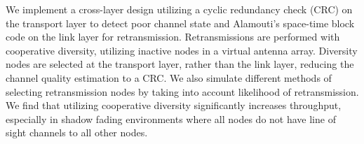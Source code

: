 We implement a cross-layer design utilizing a cyclic redundancy check (CRC) on the transport layer to detect poor channel state and Alamouti's space-time block code on the link layer for retransmission.
Retransmissions are performed with cooperative diversity, utilizing inactive nodes in a virtual antenna array.
Diversity nodes are selected at the transport layer, rather than the link layer, reducing the channel quality estimation to a CRC.
We also simulate different methods of selecting retransmission nodes by taking into account likelihood of retransmission.
We find that utilizing cooperative diversity significantly increases throughput, especially in shadow fading environments where all nodes do not have line of sight channels to all other nodes.